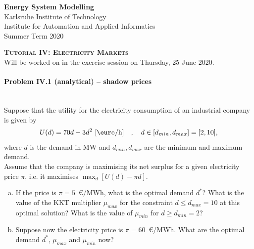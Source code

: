\documentclass[11pt,a4paper,fleqn]{scrartcl}
\begin{document}
\begin{flushright}
 \textbf{Energy System Modelling }\\
 {\small Karlsruhe Institute of Technology}\\
 {\small Institute for Automation and Applied Informatics}\\
 {\small Summer Term 2020}\\
\end{flushright}

 
 \vspace{-0.5em}
 \hrulefill
 \vspace{0.3em}

\begin{center}
 \textbf{\textsc{\Large Tutorial IV: Electricity Markets}}\\
 \small Will be worked on in the exercise session on Thursday, 25 June 2020.\\[1.5em]
\end{center}

\vspace{-0.5em}
\hrulefill
\vspace{0.8em}

\paragraph{Problem IV.1 (analytical) -- shadow prices \faGroup}~\\

Suppose that the utility for the electricity consumption of an industrial company is given by
\[
 U(d) = 70d - 3d^2 ~[\textrm{\euro}/\si{\hour}] \quad , \quad d\in [d_{min},d_{max}]=[2,10],
\]
where $d$ is the demand in MW and $d_{min}, d_{max}$ are the minimum and maximum demand. \\
[1em]
Assume that the company is maximising its net surplus for a given electricity price $\pi$, i.e. it maximises $\max_{d} \left[U(d) -
  \pi d\right]$.
\begin{enumerate}[(a)]
 \item  If the price is $\pi = 5$~\euro/MWh, what is the optimal
       demand $d^*$?  What is the value of the KKT multiplier $\mu_{max}$
       for the constraint $d \leq d_{max}=10$ at this optimal solution?
       What is the value of $\mu_{min}$ for $d \geq d_{min} = 2$?
 \item Suppose now the electricity price is $\pi = 60$~\euro/MWh. What are
       the optimal demand $d^*$, $\mu_{max}$ and $\mu_{min}$ now?
\end{enumerate}
\end{document}
